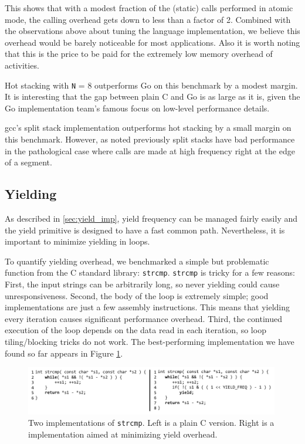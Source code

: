 \documentclass[acmsmall,anonymous,review]{acmart}\settopmatter{printfolios=true,printccs=false,printacmref=false}
\begin{document}

This shows that with a modest fraction of the (static) calls performed in atomic mode, the calling overhead gets down to less than a factor of 2.
Combined with the observations above about tuning the language implementation, we believe this overhead would be barely noticeable for most applications.
Also it is worth noting that this is the price to be paid for the extremely low memory overhead of activities.

Hot stacking with \texttt{N} = 8 outperforms Go on this benchmark by a modest margin.
It is interesting that the gap between plain C and Go is as large as it is, given the Go implementation team's famous focus on low-level performance details.

gcc's split stack implementation outperforms hot stacking by a small margin on this benchmark.
However, as noted previously split stacks have bad performance in the pathological case where calls are made at high frequency right at the edge of a segment.

\subsection{Yielding}

As described in \textsection\ref{sec:yield_imp}, yield frequency can be managed fairly easily and the yield primitive is designed to have a fast common path.
Nevertheless, it is important to minimize yielding in loops.

To quantify yielding overhead, we benchmarked a simple but problematic function from the C standard library: \texttt{strcmp}.
\texttt{strcmp} is tricky for a few reasons:
First, the input strings can be arbitrarily long, so never yielding could cause unresponsiveness.
Second, the body of the loop is extremely simple; good implementations are just a few assembly instructions.
This means that yielding every iteration causes significant performance overhead.
Third, the continued execution of the loop depends on the data read in each iteration, so loop tiling/blocking tricks do not work.
The best-performing implementation we have found so far appears in Figure \ref{fig:strcmp}.

\begin{figure}
\includegraphics[width=0.99\textwidth]{Code/strcmps}
\caption{Two implementations of \texttt{strcmp}.
  Left is a plain C version.
  Right is a \charcoal{} implementation aimed at minimizing yield overhead.}

\label{fig:strcmp}

\end{figure}
\end{document}
